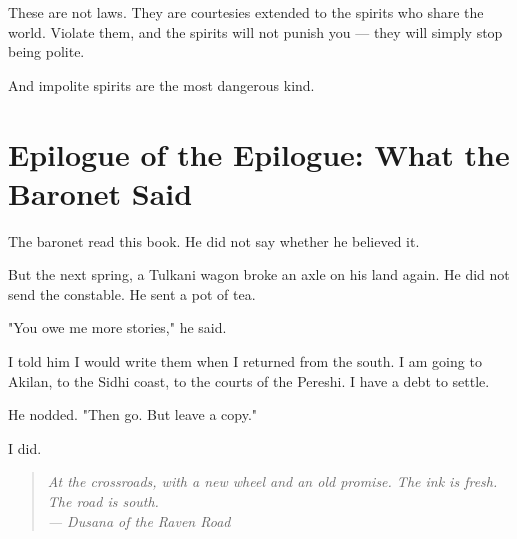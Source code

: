 \documentclass[10pt,twoside]{book}
\newcommand{\dusana}[1]{\begin{quote}\itshape #1 \\ --- Dusana of the Raven Road\end{quote}}
\begin{document}
These are not laws. They are courtesies extended to the spirits who share the world. Violate them, and the spirits will not punish you --- they will simply stop being polite.

And impolite spirits are the most dangerous kind.

\chapter*{Epilogue of the Epilogue: What the Baronet Said}

The baronet read this book. He did not say whether he believed it.

But the next spring, a Tulkani wagon broke an axle on his land again. He did not send the constable. He sent a pot of tea.

"You owe me more stories," he said.

I told him I would write them when I returned from the south. I am going to Akilan, to the Sidhi coast, to the courts of the Pereshi. I have a debt to settle.

He nodded. "Then go. But leave a copy."

I did.

\dusana{At the crossroads, with a new wheel and an old promise. The ink is fresh. The road is south.}
\end{document}
